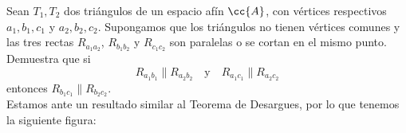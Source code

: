 \begin{ejercicio}\label{ej:5.1.38}
    Sean $T_1, T_2$ dos triángulos de un espacio afín $\cc{A}$, con vértices respectivos $a_1, b_1, c_1$ y $a_2, b_2, c_2$. Supongamos que los triángulos no tienen vértices comunes y las tres rectas $R_{a_1a_2}$, $R_{b_1b_2}$ y $R_{c_1c_2}$ son paralelas o se cortan en el mismo punto. Demuestra que si
    \begin{equation*}
        R_{a_1b_1} \| R_{a_2b_2}
        \quad \text{y} \quad
        R_{a_1c_1} \| R_{a_2c_2}
    \end{equation*}
    entonces $R_{b_1c_1} \| R_{b_2c_2}$.\\

    Estamos ante un resultado similar al Teorema de Desargues, por lo que tenemos la siguiente figura:
    \begin{figure}[H]
        \centering
        \begin{subfigure}{0.5\linewidth}
            \centering\hspace{-0.3cm}
\end{subfigure}
\end{figure}
\end{ejercicio}
